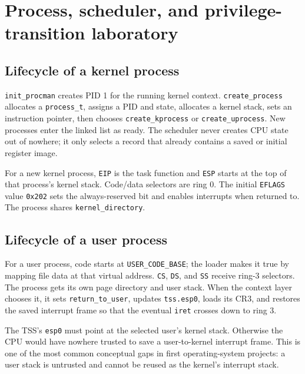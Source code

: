 
\chapter{Process, scheduler, and privilege-transition laboratory}
\section{Lifecycle of a kernel process}
\texttt{init\_procman} creates PID 1 for the running kernel context. \texttt{create\_process} allocates a \texttt{process\_t}, assigns a PID and state, allocates a kernel stack, sets an instruction pointer, then chooses \texttt{create\_kprocess} or \texttt{create\_uprocess}. New processes enter the linked list as ready. The scheduler never creates CPU state out of nowhere; it only selects a record that already contains a saved or initial register image.

For a new kernel process, \texttt{EIP} is the task function and \texttt{ESP} starts at the top of that process's kernel stack. Code/data selectors are ring 0. The initial \texttt{EFLAGS} value \texttt{0x202} sets the always-reserved bit and enables interrupts when returned to. The process shares \texttt{kernel\_directory}.

\section{Lifecycle of a user process}
For a user process, code starts at \texttt{USER\_CODE\_BASE}; the loader makes it true by mapping file data at that virtual address. \texttt{CS}, \texttt{DS}, and \texttt{SS} receive ring-3 selectors. The process gets its own page directory and user stack. When the context layer chooses it, it sets \texttt{return\_to\_user}, updates \texttt{tss.esp0}, loads its CR3, and restores the saved interrupt frame so that the eventual \texttt{iret} crosses down to ring 3.

The TSS's \texttt{esp0} must point at the selected user's kernel stack. Otherwise the CPU would have nowhere trusted to save a user-to-kernel interrupt frame. This is one of the most common conceptual gaps in first operating-system projects: a user stack is untrusted and cannot be reused as the kernel's interrupt stack.

